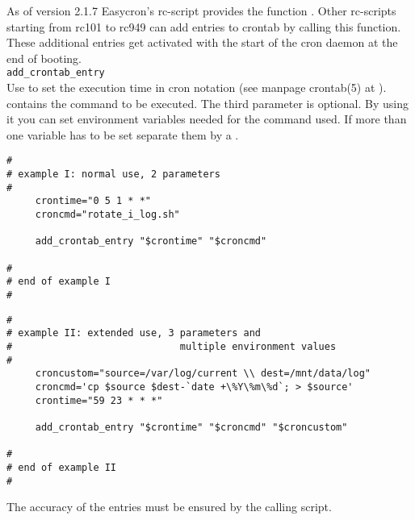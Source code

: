 


As of version 2.1.7 Easycron's rc-script provides the function 
. Other rc-scripts starting from rc101 to rc949 can 
add entries to crontab by calling this function. These additional entries get 
activated with the start of the cron daemon at the end of booting.\\

\texttt{add\_crontab\_entry} \\

Use  to set the execution time in cron notation  
(see manpage crontab(5) at ).
 contains the command to be executed. The third parameter
 is optional. By using it you can set environment variables needed 
for the command used. If more than one variable has to be set separate 
them by a \var{$\backslash\backslash$}.\\

\begin{verbatim}
#
# example I: normal use, 2 parameters
#
     crontime="0 5 1 * *"
     croncmd="rotate_i_log.sh"

     add_crontab_entry "$crontime" "$croncmd"

#
# end of example I
#
\end{verbatim}

\begin{verbatim}
#
# example II: extended use, 3 parameters and 
#                             multiple environment values 
#
     croncustom="source=/var/log/current \\ dest=/mnt/data/log"
     croncmd='cp $source $dest-`date +\%Y\%m\%d`; > $source'
     crontime="59 23 * * *"

     add_crontab_entry "$crontime" "$croncmd" "$croncustom"

#
# end of example II
#
\end{verbatim}

The accuracy of the entries must be ensured by the calling script.